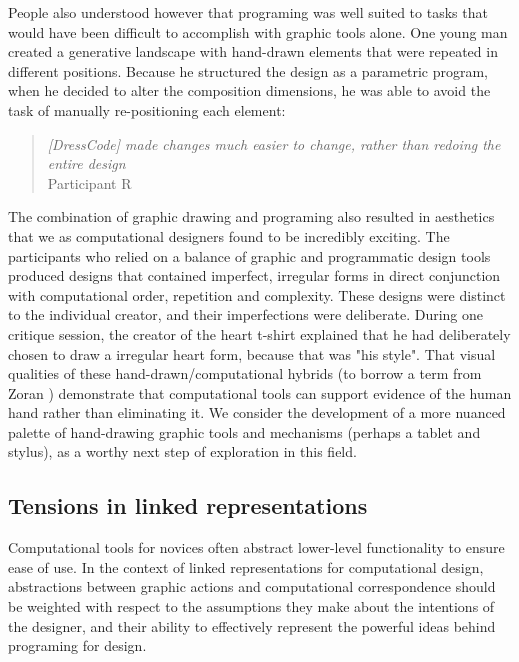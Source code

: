 \documentclass{sigchi}
\begin{document}
People also understood however that programing was well suited to tasks that would have been difficult to accomplish with graphic tools alone. One young man created a generative landscape with hand-drawn elements that were repeated in different positions. Because he structured the design as a parametric program, when he decided to alter the composition dimensions, he was able to avoid the task of manually re-positioning each element:
\begin{quotation}
  \textit{[DressCode] made changes much easier to change, rather than redoing the entire design}
  \\Participant R
\end{quotation}

The combination of graphic drawing and programing also resulted in aesthetics that we as computational designers found to be incredibly exciting. The participants who relied on a balance of graphic and programmatic design tools produced designs that contained imperfect, irregular forms in direct conjunction with computational order, repetition and complexity. These designs were distinct to the individual creator, and their imperfections were deliberate. During one critique session, the creator of the heart t-shirt explained that he had deliberately chosen to draw a irregular heart form, because that was "his style". That visual qualities of these hand-drawn/computational hybrids (to borrow a term from Zoran \cite{zoran_thesis}) demonstrate that computational tools can support evidence of the human hand rather than eliminating it. We consider the development of a more nuanced palette of hand-drawing graphic tools and mechanisms (perhaps a tablet and stylus), as a worthy next step of exploration in this field.

\subsection{Tensions in linked representations}
Computational tools for novices often abstract lower-level functionality to ensure ease of use. In the context of linked representations for computational design, abstractions between graphic actions and computational correspondence should be weighted with respect to the assumptions they make about the intentions of the designer, and their ability to effectively represent the powerful ideas behind programing for design.
\end{document}
